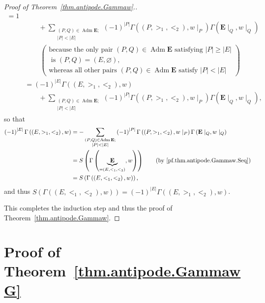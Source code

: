 \documentclass[12pt]{article}
\theoremstyle{plain}
\theoremstyle{definition}
\theoremstyle{remark}
\let\sumnonlimits\sum
\renewcommand{\sum}{\sumnonlimits\limits}
\newcommand{\Adm}{\operatorname{Adm}}
\newcommand{\EE}{{\mathbf{E}}}
\begin{document}
\begin{proof}[Proof of Theorem~\ref{thm.antipode.Gammaw}.]
\begin{align*}
{           =1}
\\
&\qquad + \sum_{\substack{\left(P, Q\right) \in \Adm \EE ; \\
                  \left|P\right| < \left|E\right|}}
\left(-1\right)^{\left|P\right|}
\Gamma\left(\left(P, >_1, <_2\right), w\mid_P\right)
\Gamma\left(\EE\mid_Q, w\mid_Q\right)
\\
& \ \ \ \ \ \ \ \ \ \ \left(
 \begin{array}{c}
  \text{because the only pair } \left(P, Q\right) \in \Adm \EE
  \text{ satisfying } \left|P\right| \geq \left|E\right| \\
  \text{ is } \left(P, Q\right) = \left(E, \varnothing\right)
  \text{,} \\
  \text{whereas all other pairs } \left(P, Q\right) \in \Adm \EE
  \text{ satisfy } \left|P\right| < \left|E\right|
 \end{array}
\right) \\
&= \left(-1\right)^{\left|E\right|} \Gamma\left(\left(E, >_1, <_2\right), w\right) \\
& \qquad
+ \sum_{\substack{\left(P, Q\right) \in \Adm \EE ; \\
                  \left|P\right| < \left|E\right|}}
\left(-1\right)^{\left|P\right|}
\Gamma\left(\left(P, >_1, <_2\right), w\mid_P\right)
\Gamma\left(\EE\mid_Q, w\mid_Q\right) ,
\end{align*}
so that
\begin{align*}
\left(-1\right)^{\left|E\right|} \Gamma\left(\left(E, >_1, <_2\right), w\right)
&= - \sum_{\substack{\left(P, Q\right) \in \Adm \EE ; \\
                  \left|P\right| < \left|E\right|}}
\left(-1\right)^{\left|P\right|}
\Gamma\left(\left(P, >_1, <_2\right), w\mid_P\right)
\Gamma\left(\EE\mid_Q, w\mid_Q\right) \\
&= S\left(\Gamma\left(\underbrace{\EE}_{=\left(E, <_1, <_2\right)}, w\right)\right)
\qquad \left(\text{by \eqref{pf.thm.antipode.Gammaw.Seq}}\right) \\
&= S\left(\Gamma\left(\left(E, <_1, <_2\right), w\right)\right) ,
\end{align*}
and thus
$S\left(\Gamma\left(\left(E, <_1, <_2\right), w\right) \right)
= \left(-1\right)^{\left|E\right|}
\Gamma\left(\left(E, >_1, <_2\right), w\right)$.

This completes the
induction step and thus the proof of Theorem~\ref{thm.antipode.Gammaw}.
\end{proof}

\section{Proof of Theorem~\ref{thm.antipode.GammawG}}
\label{sect.proofG}
\end{document}
